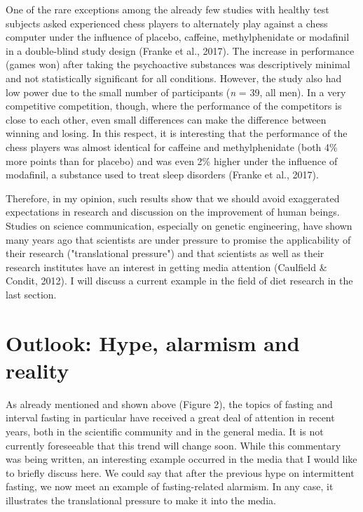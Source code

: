 \documentclass[authordate, reflection,issue]{jote-new-article}
\begin{document}
One of the rare exceptions among the already few studies with healthy test subjects asked experienced chess players to alternately play against a chess computer under the influence of placebo, caffeine, methylphenidate or modafinil in a double-blind study design (Franke et al., 2017). The increase in performance (games won) after taking the psychoactive substances was descriptively minimal and not statistically significant for all conditions. However, the study also had low power due to the small number of participants (\emph{n }= 39, all men). In a very competitive competition, though, where the performance of the competitors is close to each other, even small differences can make the difference between winning and losing. In this respect, it is interesting that the performance of the chess players was almost identical for caffeine and methylphenidate (both 4\% more points than for placebo) and was even 2\% higher under the influence of modafinil, a substance used to treat sleep disorders (Franke et al., 2017).







Therefore, in my opinion, such results show that we should avoid exaggerated expectations in research and discussion on the improvement of human beings. Studies on science communication, especially on genetic engineering, have shown many years ago that scientists are under pressure to promise the applicability of their research ("translational pressure") and that scientists as well as their research institutes have an interest in getting media attention (Caulfield \& Condit, 2012). I will discuss a current example in the field of diet research in the last section.







\section{Outlook: Hype, alarmism and reality}







As already mentioned and shown above (Figure 2), the topics of fasting and interval fasting in particular have received a great deal of attention in recent years, both in the scientific community and in the general media. It is not currently foreseeable that this trend will change soon. While this commentary was being written, an interesting example occurred in the media that I would like to briefly discuss here. We could say that after the previous hype on intermittent fasting, we now meet an example of fasting-related alarmism. In any case, it illustrates the translational pressure to make it into the media.
\end{document}
